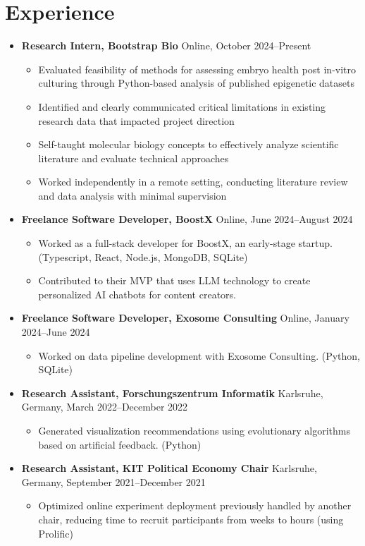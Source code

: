 \documentclass[letterpaper, 9pt]{article}
\begin{document}
\section*{Experience}
\begin{itemize}
    \item \textbf{Research Intern, Bootstrap Bio} \hfill Online, October 2024--Present
    \begin{itemize}
      \item Evaluated feasibility of methods for assessing embryo health post in-vitro culturing through Python-based analysis of published epigenetic datasets
      \item Identified and clearly communicated critical limitations in existing research data that impacted project direction
      \item Self-taught molecular biology concepts to effectively analyze scientific literature and evaluate technical approaches
      \item Worked independently in a remote setting, conducting literature review and data analysis with minimal supervision

    \end{itemize}
    \item \textbf{Freelance Software Developer, BoostX} \hfill Online, June 2024--August 2024
    \begin{itemize}
       \item Worked as a full-stack developer for BoostX, an early-stage startup. (Typescript, React, Node.js, MongoDB, SQLite)
       \item Contributed to their MVP that uses LLM technology to create personalized AI chatbots for content creators.
    \end{itemize}
    \item \textbf{Freelance Software Developer, Exosome Consulting} \hfill Online, January 2024--June 2024
    \begin{itemize}
       \item Worked on data pipeline development with Exosome Consulting. (Python, SQLite)
    \end{itemize}
    \item \textbf{Research Assistant, Forschungszentrum Informatik} \hfill Karlsruhe, Germany, March 2022--December 2022
    \begin{itemize}
        \item Generated visualization recommendations using evolutionary algorithms based on artificial feedback. (Python)
    \end{itemize}
    \item \textbf{Research Assistant, KIT Political Economy Chair} \hfill Karlsruhe, Germany, September 2021--December 2021
    \begin{itemize}
        \item Optimized online experiment deployment previously handled by another chair, reducing time to recruit participants from weeks to hours (using Prolific)
    \end{itemize}
\end{itemize}
\end{document}
